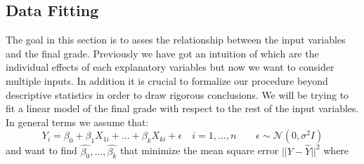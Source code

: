 \documentclass[a4paper, 11pt]{article}
\theoremstyle{definition}
\numberwithin{equation}{section}		%
\numberwithin{table}{section}				%
\begin{document}
\subsection{Data Fitting}
The goal in this section is to asses the relationship between the input variables and the final grade. Previously we have got an intuition of which are the individual effects of each explanatory variables but now we want to consider multiple inputs. In addition it is crucial to formalize our procedure beyond descriptive statistics in order to draw rigorous conclusions. We will be trying to fit a linear model of the final grade with respect to the rest of the input variables. In general terms we assume that:
$$
Y_i = \beta_0 + \beta_1X_{1i} + ... +\beta_kX_{ki} + \epsilon \quad i = 1,...,n \quad \quad \epsilon \sim \mathcal{N}(0, \sigma^2I)
$$
and want to find $\hat{\beta_0},...,\hat{\beta_k}$ that minimize the mean square error $||Y-\hat{Y}||^2$ where 
\end{document}
